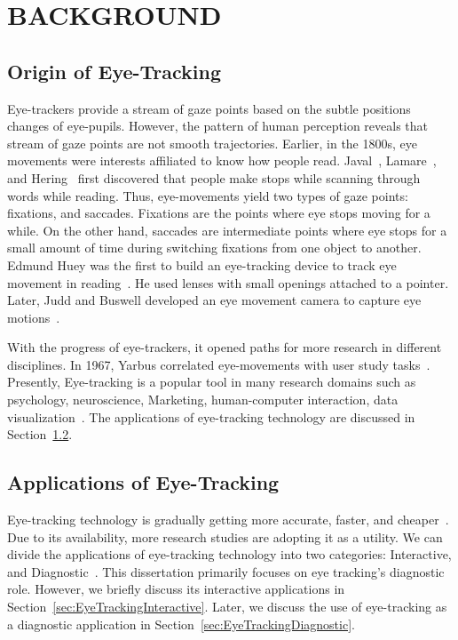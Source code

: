 \chapter{BACKGROUND}
\label{chap:Foundations}
\section{Origin of Eye-Tracking}
Eye-trackers provide a stream of gaze points based on the subtle positions changes of eye-pupils. However, the pattern of human perception reveals that stream of gaze points are not smooth trajectories. Earlier, in the 1800s, eye movements were interests affiliated to know how people read.  Javal~\cite{javal1878essai}, Lamare~\cite{lamare1893mouvements}, and  Hering~\cite{hering1879raumsinn} first discovered that people make stops while scanning through words while reading. Thus, eye-movements yield two types of gaze points: fixations, and saccades. Fixations are the points where eye stops moving for a while. On the other hand, saccades are intermediate points where eye stops for a small amount of time during switching fixations from one object to another. Edmund Huey was the first to build an eye-tracking device to track eye movement in reading~\cite{huey1908psychology}. He used lenses with small openings attached to a pointer. Later, Judd and Buswell developed an eye movement camera to capture eye motions~\cite{judd1922silent}. 

With the progress of eye-trackers, it opened paths for more research in different disciplines. In 1967, Yarbus correlated eye-movements with user study tasks~\cite{yarbus1967eye}. Presently, Eye-tracking is a popular tool in many research domains such as psychology, neuroscience, Marketing, human-computer interaction, data visualization~\cite{Duch02}. The applications of eye-tracking technology are discussed in Section~\ref{sec:EyeTrackingApplication}.



\section{Applications of Eye-Tracking}
\label{sec:EyeTrackingApplication}
Eye-tracking technology is gradually getting more accurate, faster, and cheaper~\cite{Duch07}. Due to its availability, more research studies are adopting it as a utility. We can divide the applications of eye-tracking technology into two categories: Interactive, and Diagnostic~\cite{Duch02}. This dissertation primarily focuses on eye tracking's diagnostic role. However, we briefly discuss its interactive applications in Section~\ref{sec:EyeTrackingInteractive}. Later, we discuss the use of eye-tracking as a diagnostic application in Section~\ref{sec:EyeTrackingDiagnostic}. 

